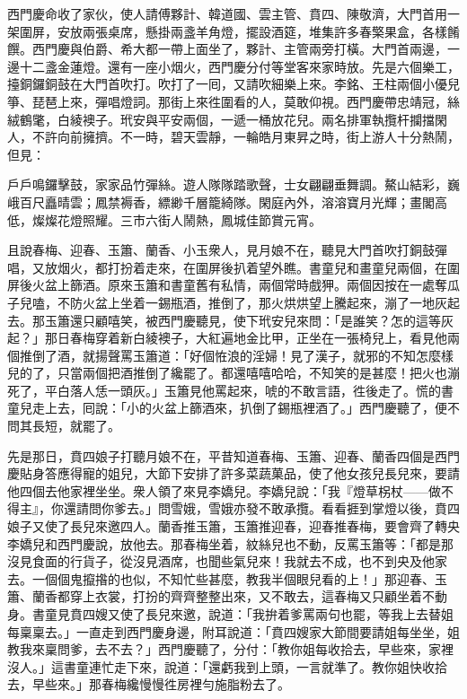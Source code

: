 西門慶命收了家伙，使人請傅夥計、韓道國、雲主管、賁四、陳敬濟，大門首用一架圍屏，安放兩張桌席，懸掛兩盞羊角燈，擺設酒筵，堆集許多春檠果盒，各樣餚饌。西門慶與伯爵、希大都一帶上面坐了，夥計、主管兩旁打橫。大門首兩邊，一邊十二盞金蓮燈。還有一座小烟火，西門慶分付等堂客來家時放。先是六個樂工，擡銅鑼銅鼓在大門首吹打。吹打了一囘，又請吹細樂上來。李銘、王柱兩個小優兒箏、琵琶上來，彈唱燈詞。那街上來徃圍看的人，莫敢仰視。西門慶帶忠靖冠，絲絨鶴氅，白綾襖子。玳安與平安兩個，一遞一桶放花兒。兩名排軍執攬杆攔擋閑人，不許向前擁擠。不一時，碧天雲靜，一輪皓月東昇之時，街上游人十分熱鬧，但見：

\begin{myquote}
戶戶鳴鑼擊鼓，家家品竹彈絲。遊人隊隊踏歌聲，士女翩翩垂舞調。鰲山結彩，巍峨百尺矗晴雲；鳳禁褥香，縹緲千層籠綺隊。閑庭內外，溶溶寶月光輝；畫閣高低，燦燦花燈照耀。三市六街人鬧熱，鳳城佳節賞元宵。
\end{myquote}

且說春梅、迎春、玉簫、蘭香、小玉衆人，見月娘不在，聽見大門首吹打銅鼓彈唱，又放烟火，都打扮着走來，在圍屏後扒着望外瞧。書童兒和畫童兒兩個，在圍屏後火盆上篩酒。原來玉簫和書童舊有私情，兩個常時戲狎。兩個因按在一處奪瓜子兒嗑，不防火盆上坐着一錫瓶酒，推倒了，那火烘烘望上騰起來，漰了一地灰起去。那玉簫還只顧嘻笑，被西門慶聽見，使下玳安兒來問：「是誰笑？怎的這等灰起？」那日春梅穿着新白綾襖子，大紅遍地金比甲，正坐在一張椅兒上，看見他兩個推倒了酒，就揚聲罵玉簫道：「好個恠浪的淫婦！見了漢子，就邪的不知怎麼樣兒的了，只當兩個把酒推倒了纔罷了。都還嘻嘻哈哈，不知笑的是甚麼！把火也漰死了，平白落人恁一頭灰。」玉簫見他罵起來，唬的不敢言語，徃後走了。慌的書童兒走上去，囘說：「小的火盆上篩酒來，扒倒了錫瓶裡酒了。」西門慶聽了，便不問其長短，就罷了。

先是那日，賁四娘子打聽月娘不在，平昔知道春梅、玉簫、迎春、蘭香四個是西門慶貼身答應得寵的姐兒，大節下安排了許多菜蔬菓品，使了他女孩兒長兒來，要請他四個去他家裡坐坐。衆人領了來見李嬌兒。李嬌兒說：「我『燈草柺杖——做不得主』，你還請問你爹去。」問雪娥，雪娥亦發不敢承攬。看看捱到掌燈以後，賁四娘子又使了長兒來邀四人。蘭香推玉簫，玉簫推迎春，迎春推春梅，要會齊了轉央李嬌兒和西門慶說，放他去。那春梅坐着，紋絲兒也不動，反罵玉簫等：「都是那沒見食面的行貨子，從沒見酒席，也聞些氣兒來！我就去不成，也不到央及他家去。一個個鬼攛揝的也似，不知忙些甚麼，教我半個眼兒看的上！」那迎春、玉簫、蘭香都穿上衣裳，打扮的齊齊整整出來，又不敢去，這春梅又只顧坐着不動身。書童見賁四嫂又使了長兒來邀，說道：「我拚着爹罵兩句也罷，等我上去替姐每稟稟去。」一直走到西門慶身邊，附耳說道：「賁四嫂家大節間要請姐每坐坐，姐教我來稟問爹，去不去？」西門慶聽了，分付：「教你姐每收拾去，早些來，家裡沒人。」這書童連忙走下來，說道：「還虧我到上頭，一言就準了。教你姐快收拾去，早些來。」那春梅纔慢慢徃房裡勻施脂粉去了。

